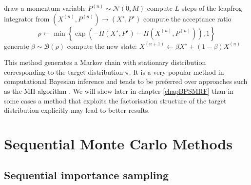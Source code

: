 \begin{algorithm}[!h]\small
	\caption{\label{alg:hmc-alg}}
	\begin{algorithmic}[1]
		\State draw a momentum variable $P^{(n)}\sim\mathcal N(0, M) $
		\State compute $L$ steps of the leapfrog integrator from $(X^{(n)},P^{(n)})\rightarrow (X^{\star},P^{\star})$ 
		\State compute the acceptance ratio
			$$ \rho \leftarrow \min\left\{\exp\left(-H(X^{\star},P^{\star})-H(X^{(n)}, P^{(n)})\right),1\right\} $$
		\State generate $\beta \sim\mathcal B(\rho)$
		\State compute the new state: $X^{(n+1)} \leftarrow \beta X^{\star}+(1-\beta)X^{(n)}$
	\end{algorithmic}
\end{algorithm}

This method generates a Markov chain with stationary distribution corresponding to the target distribution $\pi$. 
It is a very popular method in computational Bayesian inference and tends to be preferred over approaches such as the MH algorithm \citep{neal11}. We will show later in chapter \ref{chapBPSMRF} than in some cases a method that exploits the factorisation structure of the target distribution explicitly may lead to better results. 

\newpage
\section{Sequential Monte Carlo Methods}
\subsection{Sequential importance sampling}
